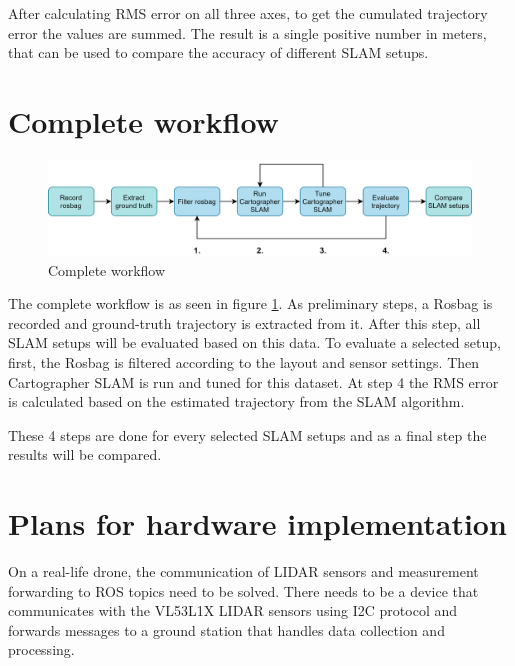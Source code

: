 After calculating RMS error on all three axes, to get the cumulated trajectory error the
values are summed. The result is a single positive number in meters, that can be used to
compare the accuracy of different SLAM setups.


\section{Complete workflow}

\begin{figure}[!h]
    \centering
    \includegraphics[width=140mm, keepaspectratio]{figures/workflow.png}
    \caption{Complete workflow}
    \label{fig:workflow}
\end{figure}

The complete workflow is as seen in figure \ref{fig:workflow}. As preliminary steps, a Rosbag is
recorded and ground-truth trajectory is extracted from it. After this step, all SLAM setups
will be evaluated based on this data. To evaluate a selected setup, first, the Rosbag is
filtered according to the layout and sensor settings. Then Cartographer SLAM is run and
tuned for this dataset. At step 4 the RMS error is calculated based on the estimated
trajectory from the SLAM algorithm.

These 4 steps are done for every selected SLAM setups and as a final step the results
will be compared.


 






\newpage


\section{Plans for hardware implementation}
On a real-life drone, the communication of LIDAR sensors and measurement forwarding to ROS topics need
to be solved. There needs to be a device that communicates with the VL53L1X LIDAR sensors using I2C
protocol and forwards messages to a ground station that handles data collection and processing.

